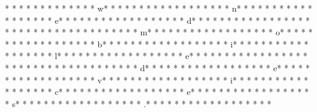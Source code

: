 *  * * *  *  * * *  *  * * *  * w* * *  * * *  * * *  *  * * *  *  * * *  * n* * *  * * *  * * *  *  * * *  *  * * *  * e* * *  * * *  * * *  *  * * *  *  * * *  * d* * *  * * *  * * *  *  * * *  *  * * *  *  * * *  * * *  * * *  *  * * *  *  * * *  * m* * *  * * *  * * *  *  * * *  *  * * *  * o* * *  * * *  * * *  *  * * *  *  * * *  * b* * *  * * *  * * *  *  * * *  *  * * *  * i* * *  * * *  * * *  *  * * *  *  * * *  * l* * *  * * *  * * *  *  * * *  *  * * *  * e* * *  * * *  * * *  *  * * *  *  * * *  *  * * *  * * *  * * *  *  * * *  *  * * *  * d* * *  * * *  * * *  *  * * *  *  * * *  * e* * *  * * *  * * *  *  * * *  *  * * *  * v* * *  * * *  * * *  *  * * *  *  * * *  * i* * *  * * *  * * *  *  * * *  *  * * *  * c* * *  * * *  * * *  *  * * *  *  * * *  * e* * *  * * *  * * *  *  * * *  *  * * *  * s* * *  * * *  * * *  *  * * *  *  * * *  * .* * *  * * *  * * *  *  * * *  *  * * *  * 
